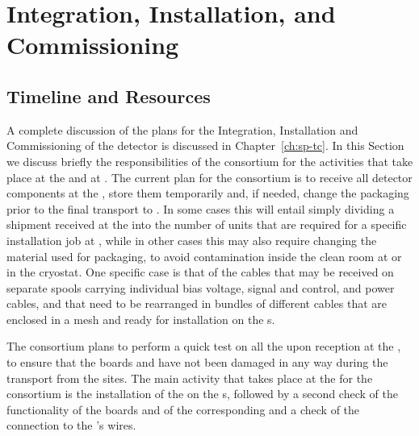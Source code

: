 \section{Integration, Installation, and Commissioning}
\label{sec:fdsp-tpcelec-integration}


\subsection{Timeline and Resources}
\label{sec:fdsp-tpcelec-integration-timeline}

A complete discussion of the plans for the Integration, Installation
and Commissioning of the detector is discussed in Chapter~\ref{ch:sp-tc}.
In this Section we discuss briefly the responsibilities of the 
consortium for the activities that take place at the
 and at \surf. The current plan for the 
consortium is to receive all detector components at the ,
store them temporarily and, if needed, change the packaging prior to
the final transport to \surf. In some cases this will entail simply
dividing a shipment received at the  into the number of
units that are required for a specific installation job at \surf,
while in other cases this may also require changing the material
used for packaging, to avoid contamination inside the clean room
at \surf or in the cryostat. One specific case is that of the 
cables that may be received on separate spools carrying 
individual bias voltage, signal and control, and power cables, and that 
need to be rearranged in bundles of different cables that are enclosed
in a mesh and ready for installation on the s. 

The  consortium plans to perform a quick test on all
the  upon reception at the , to ensure that
the boards and  have not been damaged in any way during the transport 
from the   sites. The main activity that takes 
place at the  for the  consortium is the 
installation of the  on the s, followed by 
a second check of the functionality of the boards and of the 
corresponding  and a check of the connection to the 
's wires. 

